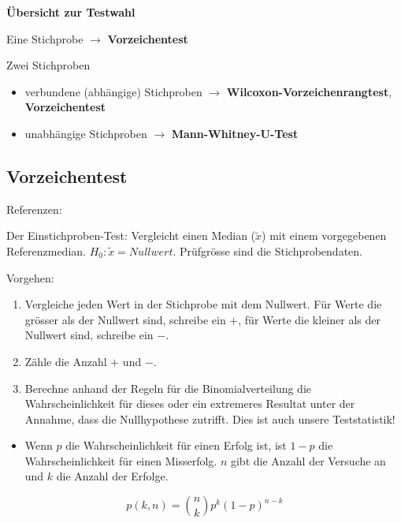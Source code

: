 \documentclass[
]{book}
\providecommand{\tightlist}{%
  \setlength{\itemsep}{0pt}\setlength{\parskip}{0pt}}
\begin{document}
\textbf{Übersicht zur Testwahl}

Eine Stichprobe \(\rightarrow\) \textbf{Vorzeichentest}

Zwei Stichproben

\begin{itemize}
\tightlist
\item
  verbundene (abhängige) Stichproben \(\rightarrow\) \textbf{Wilcoxon-Vorzeichenrangtest}, \textbf{Vorzeichentest}\\
\item
  unabhängige Stichproben \(\rightarrow\) \textbf{Mann-Whitney-U-Test}
\end{itemize}

\hypertarget{vorzeichentest}{%
\subsection{Vorzeichentest}\label{vorzeichentest}}

Referenzen: \citet{King2019}

Der Einstichproben-Test: Vergleicht einen Median (\(\tilde{x}\)) mit einem vorgegebenen Referenzmedian. \(H_0: \tilde{x} = Nullwert\). Prüfgrösse sind die Stichprobendaten.

Vorgehen:

\begin{enumerate}
\def\labelenumi{\arabic{enumi}.}
\tightlist
\item
  Vergleiche jeden Wert in der Stichprobe mit dem Nullwert. Für Werte die grösser als
  der Nullwert sind, schreibe ein \(+\), für Werte die kleiner als der Nullwert sind, schreibe ein \(-\).\\
\item
  Zähle die Anzahl \(+\) und \(-\).
\item
  Berechne anhand der Regeln für die Binomialverteilung die Wahrscheinlichkeit für dieses oder ein extremeres Resultat unter der Annahme, dass die Nullhypothese zutrifft. Dies ist auch unsere Teststatistik!
\end{enumerate}

\begin{itemize}
\tightlist
\item
  Wenn \(p\) die Wahrscheinlichkeit für einen Erfolg ist, ist \(1-p\) die Wahrscheinlichkeit für einen Misserfolg. \(n\) gibt die Anzahl der Versuche an und \(k\) die Anzahl der Erfolge.
\end{itemize}

\begin{equation}
  p(k, n) =  {n \choose k}p^k(1-p)^{n-k}
  \label{eq:binom3}
\end{equation}
\end{document}
